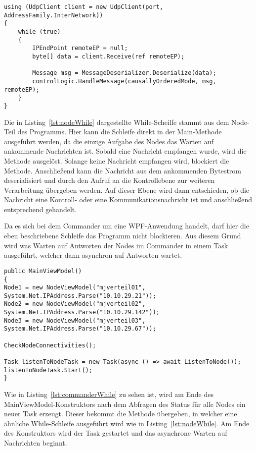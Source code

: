 \begin{lstlisting}[label=lst:nodeWhile,
language=sharpc,
float=ht,
firstnumber=1,
captionpos=b,
caption=While-Scheife für das Warten auf neue Nachrichten. Auszug aus dem Node.]
using (UdpClient client = new UdpClient(port, AddressFamily.InterNetwork))
{
	while (true)
	{
		IPEndPoint remoteEP = null;
		byte[] data = client.Receive(ref remoteEP);

		Message msg = MessageDeserializer.Deserialize(data);
		controlLogic.HandleMessage(causallyOrderedMode, msg, remoteEP);
	}
}
\end{lstlisting}

Die in Listing~\ref{lst:nodeWhile} dargestellte While-Scheilfe stammt aus dem Node-Teil des Programms. Hier kann die Schleife direkt in der Main-Methode ausgeführt werden, da die einzige Aufgabe des Nodes das Warten auf ankommende Nachrichten ist. Sobald eine Nachricht empfangen wurde, wird die Methode  ausgelöst. Solange keine Nachricht empfangen wird, blockiert die Methode. Anschließend kann die Nachricht aus dem ankommenden Bytestrom deserialisiert und durch den Aufruf  an die Kontrollebene zur weiteren Verarbeitung übergeben werden. Auf dieser Ebene wird dann entschieden, ob die Nachricht eine Kontroll- oder eine Kommunikationsnachricht ist und anschließend entsprechend gehandelt.

Da es sich bei dem Commander um eine WPF-Anwendung handelt, darf hier die eben beschriebene Schleife das Programm nicht blockieren. Aus diesem Grund wird was Warten auf Antworten der Nodes im Commander in einem Task ausgeführt, welcher dann asynchron auf Antworten wartet.

\begin{lstlisting}[label=lst:commanderWhile,
language=sharpc,
float=ht,
firstnumber=1,
captionpos=b,
caption=Starten eines neuen Tasks um asynchron auf eventuelle Rückantworten der Nodes zu warten.]
public MainViewModel()
{
Node1 = new NodeViewModel("mjverteil01", System.Net.IPAddress.Parse("10.10.29.21"));
Node2 = new NodeViewModel("mjverteil02", System.Net.IPAddress.Parse("10.10.29.142"));
Node3 = new NodeViewModel("mjverteil03", System.Net.IPAddress.Parse("10.10.29.67"));

CheckNodeConnectivities();

Task listenToNodeTask = new Task(async () => await ListenToNode());
listenToNodeTask.Start();
}
\end{lstlisting}

Wie in Listing~\ref{lst:commanderWhile} zu sehen ist, wird am Ende des MainViewModel-Konstruktors nach dem Abfragen des Status für alle Nodes ein neuer Task  erzeugt. Dieser bekommt die Methode  übergeben, in welcher eine ähnliche While-Schleife ausgeführt wird wie in Listing~\ref{lst:nodeWhile}. Am Ende des Konstruktors wird der Task gestartet und das asynchrone Warten auf Nachrichten beginnt.

